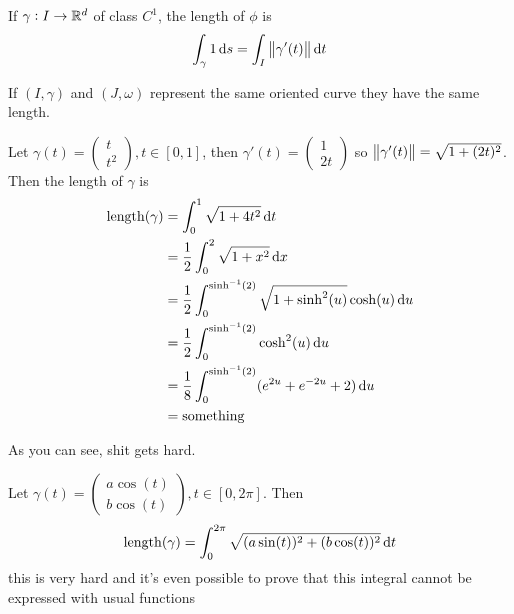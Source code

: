 \documentclass[14pt]{extarticle}
\begin{document}
\begin{definition}
    If $\gamma: I \to \mathbb{R}^d$ of class $C^1$, the length of $\phi$ is
    \begin{equation}
        \int_\gamma 1 \dd{s} = \int_I \norm{\gamma'(t)} \dd{t}
    \end{equation}
\end{definition}

\begin{lemma}
    If $(I, \gamma)$ and $(J, \omega)$ represent the same oriented curve they have the same length.
\end{lemma}

\begin{example}[length of $y = x^2$ between $(0,0)$ and $(1,1)$]
    Let $\gamma(t) = \begin{pmatrix}
            t \\ t^2
        \end{pmatrix}, t \in [0, 1]$,
    then $\gamma'(t) = \begin{pmatrix}
            1 \\ 2t
        \end{pmatrix}$
    so $\norm{\gamma'(t)} = \sqrt{1+(2t)^2}$.
    Then the length of $\gamma$ is
    \begin{align}
        {\operatorfont length}(\gamma) & = \int_0^1 \sqrt{1 + 4t^2} \dd{t}                                        \\
                                       & = \frac{1}{2} \int_0^2 \sqrt{1+x^2} \dd{x}                               \\
                                       & = \frac{1}{2} \int_0^{\sinh^{-1}(2)} \sqrt{1+\sinh^2(u)} \cosh(u) \dd{u} \\
                                       & = \frac{1}{2} \int_0^{\sinh^{-1}(2)} \cosh^2(u) \dd{u}                   \\
                                       & = \frac{1}{8} \int_0^{\sinh^{-1}(2)} (e^{2u} + e^{-2u} + 2) \dd{u}       \\
                                       & = \text{something}
    \end{align}

    As you can see, shit gets hard.
\end{example}

\begin{example}
    Let $\gamma(t) = \begin{pmatrix}
            a \cos (t) \\
            b \cos (t)
        \end{pmatrix}, t \in[0, 2\pi]$.
    Then
    \begin{equation}
        {\operatorfont length}(\gamma) = \int_0^{2\pi} \sqrt{(a \sin(t))^2 + (b \cos (t))^2} \dd{t}
    \end{equation}
    this is very hard and it's even possible to prove that this integral cannot be expressed with usual functions
\end{example}
\end{document}
